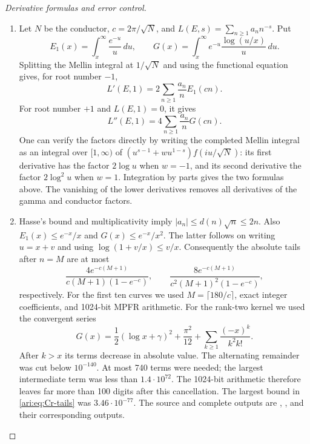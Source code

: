 \begin{proof}[Derivative formulas and error control]
\begin{enumerate}[label=\arabic*.,leftmargin=*]
\item Let $N$ be the conductor, $c=2\pi/\sqrt N$, and
$L(E,s)=\sum_{n\geq1}a_nn^{-s}$. Put
\[
 E_1(x)=\int_x^\infty\frac{e^{-u}}u\,du,
 \qquad G(x)=\int_x^\infty e^{-u}\frac{\log(u/x)}u\,du.
\]
Splitting the Mellin integral at $1/\sqrt N$ and using the functional
equation gives, for root number $-1$,
\begin{equation}\label{ari:eq:Cr-first}
 L'(E,1)=2\sum_{n\geq1}\frac{a_n}{n}E_1(cn).
\end{equation}
For root number $+1$ and $L(E,1)=0$, it gives
\begin{equation}\label{ari:eq:Cr-second}
 L''(E,1)=4\sum_{n\geq1}\frac{a_n}{n}G(cn).
\end{equation}
One can verify the factors directly by writing the completed Mellin
integral as an integral over $[1,\infty)$ of
$(u^{s-1}+wu^{1-s})f(iu/\sqrt N)$: its first derivative has
the factor $2\log u$ when $w=-1$, and its second derivative
the factor $2\log^2u$ when $w=1$. Integration by parts gives
the two formulas above. The vanishing of the lower derivatives
removes all derivatives of the gamma and conductor factors.

\item Hasse's bound and multiplicativity imply
$|a_n|\leq d(n)\sqrt n\leq2n$. Also
$E_1(x)\leq e^{-x}/x$ and $G(x)\leq e^{-x}/x^2$.
The latter follows on writing $u=x+v$ and using
$\log(1+v/x)\leq v/x$. Consequently the absolute tails after
$n=M$ are at most
\begin{equation}\label{ari:eq:Cr-tails}
 \frac{4e^{-c(M+1)}}{c(M+1)(1-e^{-c})},\qquad
 \frac{8e^{-c(M+1)}}{c^2(M+1)^2(1-e^{-c})},
\end{equation}
respectively. For the first ten curves we used
$M=\lceil180/c\rceil$, exact integer coefficients, and 1024-bit
MPFR arithmetic. For the rank-two kernel we used the convergent series
\[
 G(x)=\frac12(\log x+\gamma)^2+\frac{\pi^2}{12}
       +\sum_{k\geq1}\frac{(-x)^k}{k^2k!}.
\]
After $k>x$ its terms decrease in absolute value. The alternating
remainder was cut below $10^{-140}$. At most 740 terms were needed;
the largest intermediate term was less than $1.4\cdot10^{72}$.
The 1024-bit arithmetic therefore leaves far more than 100 digits
after this cancellation. The largest bound in
\eqref{ari:eq:Cr-tails} was $3.46\cdot10^{-77}$. The source and complete
outputs are ,
, and their corresponding outputs.


\end{enumerate}
\end{proof}
